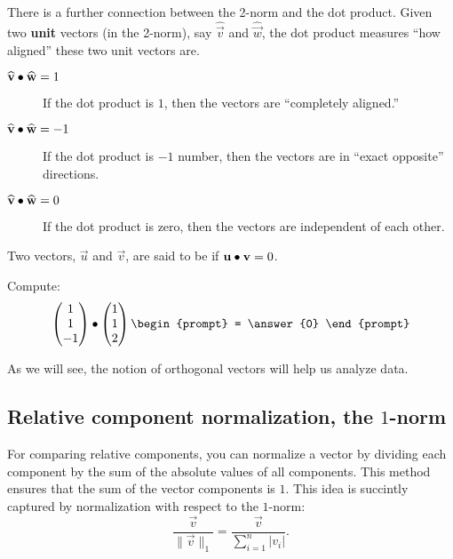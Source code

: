 \documentclass{ximera}
\begin{document}
There is a further connection between the 2-norm and the dot
product. Given two \textbf{unit} vectors (in the 2-norm), say
$\hat{\vec v}$ and $\hat{\vec w}$, the dot product measures ``how
aligned'' these two unit vectors are.
\begin{description}
\item[$\widehat{\mathbf{v}}\bullet \widehat{\mathbf{w}} = 1$] If the dot product is
  $1$, then the vectors are ``completely aligned.''
\item[$\widehat{\mathbf{v}}\bullet \widehat{\mathbf{w}} = -1$] If the dot product is
  $-1$ number, then the vectors are in ``exact opposite'' directions.
\item[$\widehat{\mathbf{v}}\bullet \widehat{\mathbf{w}} = 0$]If the dot product is
  zero, then the vectors are independent of each other.
\end{description}

\begin{definition}
  Two vectors, $\vec{u}$ and $\vec{v}$, are said to be
   if $\mathbf{u} \bullet \mathbf{v} = 0$.
\end{definition}


\begin{question}
  Compute:
  \[
  \begin{pmatrix}1\\1\\-1\end{pmatrix}\dotp\begin{pmatrix}1\\1\\2\end{pmatrix}
  \begin{prompt}
    = \answer{0}
  \end{prompt}
  \]
\end{question}

As we will see, the notion of orthogonal vectors will help us analyze data.






\subsection{Relative component normalization, the $1$-norm}

For comparing relative components, you can normalize a vector by
dividing each component by the sum of the absolute values of all
components. This method ensures that the sum of the vector components
is $1$. This idea is succintly captured by normalization with respect
to the $1$-norm:
\[
  \frac{\vec{v}}{\|\vec{v}\|_1} = \frac{\vec{v}}{\sum_{i=1}^n |v_i|}.
\]
\end{document}
